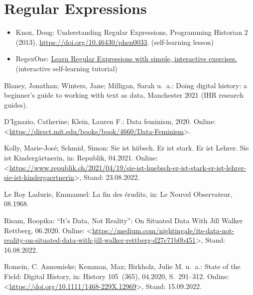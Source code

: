 \documentclass[
  letterpaper,
]{book}
\newlength{\cslhangindent}
\newlength{\cslentryspacingunit} %
\newenvironment{CSLReferences}[2] %
 {%
  \setlength{\parindent}{0pt}
  \ifodd #1
  \let\oldpar\par
  \def\par{\hangindent=\cslhangindent\oldpar}
  \fi
  \setlength{\parskip}{#2\cslentryspacingunit}
 }%
 {}
\begin{document}
\hypertarget{regular-expressions}{%
\section{Regular Expressions}\label{regular-expressions}}

\begin{itemize}
\item
  Knox, Doug: Understanding Regular Expressions, Programming Historian 2
  (2013), \url{https://doi.org/10.46430/phen0033}. (self-learning
  lesson)
\item
  RegexOne: \href{https://regexone.com/}{Learn Regular Expressions with
  simple, interactive exercises.} (interactive self-learning tutorial)
\end{itemize}

\hypertarget{refs}{}
\begin{CSLReferences}{0}{0}
\leavevmode{}%
Blaney, Jonathan; Winters, Jane; Milligan, Sarah u.~a.: Doing digital
history: a beginner's guide to working with text as data, Manchester
2021 ({IHR} research guides).

\leavevmode{}%
D'Ignazio, Catherine; Klein, Lauren F.: Data feminism, 2020. Online:
\textless{}\url{https://direct.mit.edu/books/book/4660/Data-Feminism}\textgreater.

\leavevmode{}%
Kolly, Marie-José; Schmid, Simon: Sie ist h{ü}bsch. {Er} ist stark. {Er}
ist {Lehrer}. {Sie} ist {Kinderg{ä}rtnerin}, in: Republik, 04.2021.
Online:
\textless{}\url{https://www.republik.ch/2021/04/19/sie-ist-huebsch-er-ist-stark-er-ist-lehrer-sie-ist-kindergaertnerin}\textgreater,
Stand: 23.08.2022.

\leavevmode{}%
Le Roy Ladurie, Emmanuel: La fin des {é}rudits, in: Le Nouvel
Observateur, 08.1968.

\leavevmode{}%
Risam, Roopika: {``}{It}{'}s {Data}, {Not} {Reality}{''}: {On}
{Situated} {Data} {With} {Jill} {Walker} {Rettberg}, 06.2020. Online:
\textless{}\url{https://medium.com/nightingale/its-data-not-reality-on-situated-data-with-jill-walker-rettberg-d27c71b0b451}\textgreater,
Stand: 16.08.2022.

\leavevmode{}%
Romein, C. Annemieke; Kemman, Max; Birkholz, Julie M. u.~a.: State of
the {Field}: {Digital} {History}, in: History 105~(365), 04.2020,
S.~291--312. Online:
\textless{}\url{https://doi.org/10.1111/1468-229X.12969}\textgreater,
Stand: 15.09.2022.

\end{CSLReferences}


\backmatter
\end{document}
